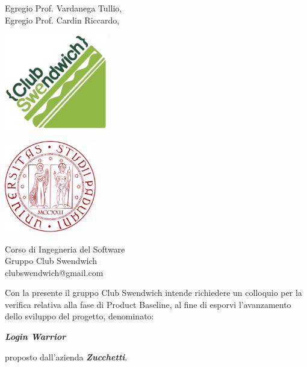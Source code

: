 \documentclass[a4paper, 12pt]{letter}
\begin{document}
    \begin{letter}
        { 	Egregio Prof. Vardanega Tullio,\\
        		Egregio Prof. Cardin Riccardo,}
        \begin{minipage}{.55\textwidth}
            \begin{center}
                \includegraphics[width=4.5cm]{../../assets/ClubSweLogo.png}
            \end{center}
        \end{minipage}
        \begin{minipage}{.3\textwidth}
            \begin{flushright}
                \includegraphics[width=4cm]{../../assets/logoUnipd.png}
            \end{flushright}
        \end{minipage}
        {    
        \begin{center}
            Corso di Ingegneria del Software\\ 
            Gruppo Club Swendwich\\ 
            clubswendwich@gmail.com
        \end{center}
        }
        \opening{ 
        		 Con la presente il gruppo Club Swendwich intende richiedere un colloquio per la verifica relativa alla fase di Product Baseline, al fine di esporvi l'avanzamento dello sviluppo del progetto, denominato:}
        \begin{center}
           \textbf{\textit{Login Warrior}} 
        \end{center}
        proposto dall'azienda \textbf{\textit{Zucchetti}}.\\

\end{letter}
\end{document}
